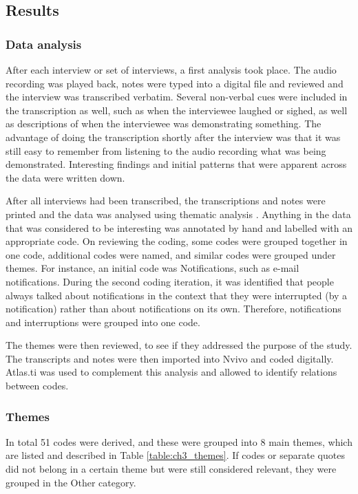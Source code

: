 \documentclass[11pt,oneside]{report}
\begin{document}
\subsection{Results}
\subsubsection{Data analysis}
After each interview or set of interviews, a first analysis took place. The audio recording was played back, notes were typed into a digital file and reviewed and the interview was transcribed verbatim. Several non-verbal cues were included in the transcription as well, such as when the interviewee laughed or sighed, as well as descriptions of when the interviewee was demonstrating something. The advantage of doing the transcription shortly after the interview was that it was still easy to remember from listening to the audio recording what was being demonstrated. Interesting findings and initial patterns that were apparent across the data were written down. 

After all interviews had been transcribed, the transcriptions and notes were printed and the data was analysed using thematic analysis \citep{Braun2006}. Anything in the data that was considered to be interesting was annotated by hand and labelled with an appropriate code. On reviewing the coding, some codes were grouped together in one code, additional codes were named, and similar codes were grouped under themes. For instance, an initial code was Notifications, such as e-mail notifications. During the second coding iteration, it was identified that people always talked about notifications in the context that they were interrupted (by a notification) rather than about notifications on its own. Therefore, notifications and interruptions were grouped into one code. 

The themes were then reviewed, to see if they addressed the purpose of the study. The transcripts and notes were then imported into Nvivo and coded digitally. Atlas.ti was used to complement this analysis and allowed to identify relations between codes. 

\subsubsection{Themes}
In total 51 codes were derived, and these were grouped into 8 main themes, which are listed and described in Table \ref{table:ch3_themes}. If codes or separate quotes did not belong in a certain theme but were still considered relevant, they were grouped in the Other category. 
\end{document}

